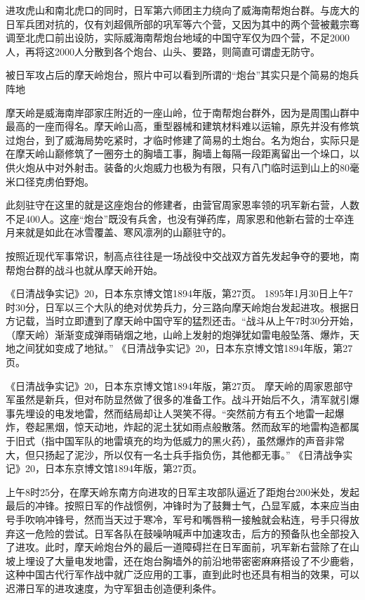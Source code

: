 \documentclass[12pt,UTF8]{ctexbook}
\begin{document}
进攻虎山和南北虎口的同时，日军第六师团主力绕向了威海南帮炮台群。与庞大的日军兵团对抗的，仅有刘超佩所部的巩军等六个营，又因为其中的两个营被戴宗骞调至北虎口前出设防，实际威海南帮炮台地域的中国守军仅为四个营，不足2000人，再将这2000人分散到各个炮台、山头、要路，则简直可谓虚无防守。


被日军攻占后的摩天岭炮台，照片中可以看到所谓的“炮台”其实只是个简易的炮兵阵地

摩天岭是威海南岸邵家庄附近的一座山岭，位于南帮炮台群外，因为是周围山群中最高的一座而得名。摩天岭山高，重型器械和建筑材料难以运输，原先并没有修筑过炮台，到了威海局势吃紧时，才临时修建了简易的土炮台。名为炮台，实际只是在摩天岭山巅修筑了一圈夯土的胸墙工事，胸墙上每隔一段距离留出一个垛口，以供火炮从中对外射击。装备的火炮威力也极为有限，只有八门临时运到山上的80毫米口径克虏伯野炮。

此刻驻守在这里的就是这座炮台的修建者，由营官周家恩率领的巩军新右营，人数不足400人。这座“炮台”既没有兵舍，也没有弹药库，周家恩和他新右营的士卒连月来就是如此在冰雪覆盖、寒风凛冽的山巅驻守的。

按照近现代军事常识，制高点往往是一场战役中交战双方首先发起争夺的要地，南帮炮台群的战斗也就从摩天岭开始。

《日清战争实记》20，日本东京博文馆1894年版，第27页。
1895年1月30日上午7时30分，日军以三个大队的绝对优势兵力，分三路向摩天岭炮台发起进攻。根据日方记载，当时立即遭到了摩天岭中国守军的猛烈还击。“战斗从上午7时30分开始，（摩天岭）渐渐变成弹雨硝烟之地，山岭上发射的炮弹犹如雷电般坠落、爆炸，天地之间犹如变成了地狱。” 《日清战争实记》20，日本东京博文馆1894年版，第27页。

《日清战争实记》20，日本东京博文馆1894年版，第27页。
摩天岭的周家恩部守军虽然是新兵，但对布防显然做了很多的准备工作。战斗开始后不久，清军就引爆事先埋设的电发地雷，然而结局却让人哭笑不得。“突然前方有五个地雷一起爆炸，卷起黑烟，惊天动地，炸起的泥土犹如雨点般散落。然而敌军的地雷构造都属于旧式（指中国军队的地雷填充的均为低威力的黑火药），虽然爆炸的声音非常大，但只扬起了泥沙，所以仅有一名士兵手指负伤，其他都无事。” 《日清战争实记》20，日本东京博文馆1894年版，第27页。

上午8时25分，在摩天岭东南方向进攻的日军主攻部队逼近了距炮台200米处，发起最后的冲锋。按照日军的作战惯例，冲锋时为了鼓舞士气，凸显军威，本来应当由号手吹响冲锋号，然而当天过于寒冷，军号和嘴唇稍一接触就会粘连，号手只得放弃这一危险的尝试。日军各队在鼓噪呐喊声中加速攻击，后方的预备队也全部投入了进攻。此时，摩天岭炮台外的最后一道障碍拦在日军面前，巩军新右营除了在山坡上埋设了大量电发地雷，还在炮台胸墙外的前沿地带密密麻麻搭设了不少鹿砦，这种中国古代行军作战中就广泛应用的工事，直到此时也还具有相当的效果，可以迟滞日军的进攻速度，为守军狙击创造便利条件。
\end{document}
